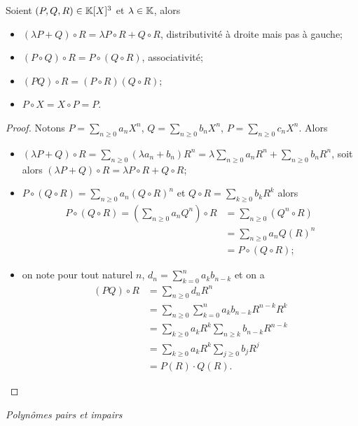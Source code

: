 \begin{prop}
  Soient \((P,Q,R) \in \mathbb{K}[X]^3\) et \(\lambda \in \mathbb{K}\), alors
  \begin{itemize}
  \item \((\lambda P+Q)\circ R = \lambda P \circ R +Q \circ R\), distributivité à droite mais pas à gauche;
  \item \((P \circ Q) \circ R = P \circ (Q \circ R)\), associativité;
  \item \((PQ)\circ R = (P \circ R)(Q \circ R)\);
  \item \(P \circ X = X \circ P=P\).
  \end{itemize}
\end{prop}
\begin{proof}
  Notons \(P=\sum_{n \geqslant 0} a_n X^n\), \(Q=\sum_{n \geqslant 0} b_n X^n\), \(P=\sum_{n \geqslant 0} c_n X^n\). Alors
  \begin{itemize}
  \item \((\lambda P+Q)\circ R = \sum_{n \geqslant 0} (\lambda a_n+b_n) R^n = \lambda \sum_{n \geqslant 0} a_n R^n + \sum_{n \geqslant 0} b_n R^n\), soit alors \( (\lambda P+Q)\circ R = \lambda P \circ R +Q \circ R\);
  \item \(P \circ (Q \circ R) = \sum_{n \geqslant 0} a_n (Q \circ R)^n\) et \(Q \circ R = \sum_{k \geqslant 0} b_k R^k\) alors
    \begin{align}
      P \circ (Q \circ R) = \left(\sum_{n \geqslant 0} a_n Q^n \right) \circ R &= \sum_{n \geqslant 0} (Q^n \circ R) \\
      &= \sum_{n \geqslant 0} a_n Q(R)^n\\
      &=P \circ (Q \circ R);
    \end{align}
  \item on note pour tout naturel \(n\), \(d_n=\sum_{k=0}^n a_k b_{n-k}\) et on a
    \begin{align}
      (PQ)\circ R &= \sum_{n \geqslant 0} d_n R^n \\
      &= \sum_{n \geqslant 0} \sum_{k=0}^n a_k b_{n-k} R^{n-k}R^k \\
      &= \sum_{k \geqslant 0} a_k R^k \sum_{n \geqslant k} b_{n-k} R^{n-k}\\
      &=\sum_{k\geqslant 0} a_k R^k \sum_{j \geqslant 0} b_j R^j\\
      &=P(R) \cdot Q(R).
    \end{align}
  \end{itemize}
\end{proof}

\emph{Polynômes pairs et impairs}

